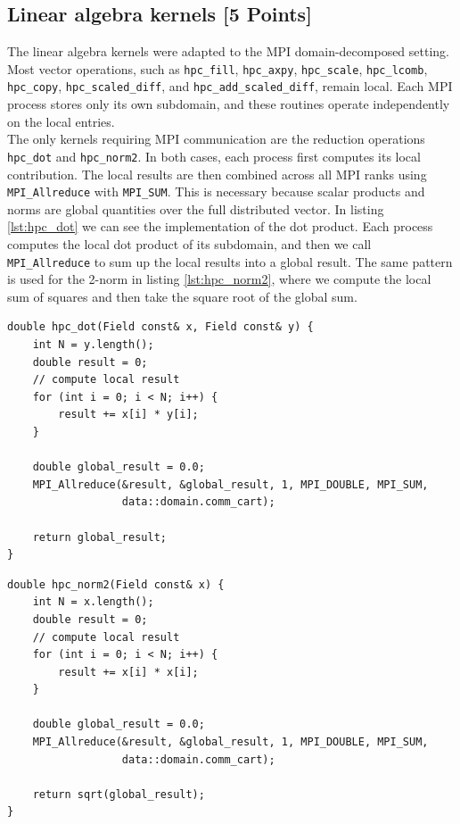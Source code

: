 \documentclass[unicode,10pt,a4paper,oneside,numbers=endperiod,openany]{scrartcl}
\begin{document}
\subsection{Linear algebra kernels [5 Points]}
The linear algebra kernels were adapted to the MPI domain-decomposed setting.
Most vector operations, such as \texttt{hpc\_fill}, \texttt{hpc\_axpy},
\texttt{hpc\_scale}, \texttt{hpc\_lcomb}, \texttt{hpc\_copy},
\texttt{hpc\_scaled\_diff}, and \texttt{hpc\_add\_scaled\_diff}, remain local.
Each MPI process stores only its own subdomain, and these routines operate
independently on the local entries.\\

The only kernels requiring MPI communication are the reduction operations
\texttt{hpc\_dot} and \texttt{hpc\_norm2}. In both cases, each process first
computes its local contribution. The local results are then combined across all
MPI ranks using \texttt{MPI\_Allreduce} with \texttt{MPI\_SUM}. This is necessary
because scalar products and norms are global quantities over the full
distributed vector. In listing \ref{lst:hpc_dot} we can see the implementation of the dot product. Each process computes the local dot product of its subdomain, and then we call \texttt{MPI\_Allreduce} to sum up the local results into a global result. The same pattern is used for the 2-norm in listing \ref{lst:hpc_norm2}, where we compute the local sum of squares and then take the square root of the global sum.

\begin{lstlisting}[style=grayverbatim,label={lst:hpc_dot},caption={MPI parallel implementation of the dot product}]
double hpc_dot(Field const& x, Field const& y) {
    int N = y.length();
    double result = 0;
    // compute local result
    for (int i = 0; i < N; i++) {
        result += x[i] * y[i];
    }

    double global_result = 0.0;
    MPI_Allreduce(&result, &global_result, 1, MPI_DOUBLE, MPI_SUM,
                  data::domain.comm_cart);

    return global_result;
}
\end{lstlisting}

\begin{lstlisting}[style=grayverbatim,label={lst:hpc_norm2},caption={MPI parallel implementation of the 2-norm}]
double hpc_norm2(Field const& x) {
    int N = x.length();
    double result = 0;
    // compute local result
    for (int i = 0; i < N; i++) {
        result += x[i] * x[i];
    }

    double global_result = 0.0;
    MPI_Allreduce(&result, &global_result, 1, MPI_DOUBLE, MPI_SUM,
                  data::domain.comm_cart);

    return sqrt(global_result);
}
\end{lstlisting}
\end{document}
